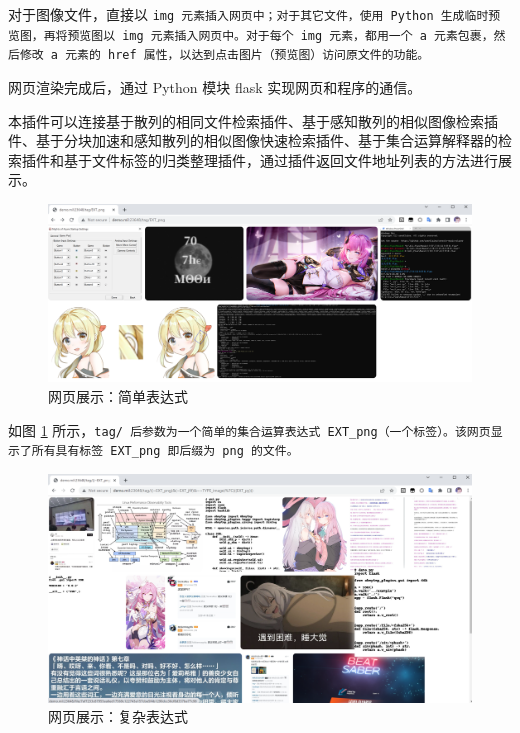 对于图像文件，直接以 \tt{img} 元素插入网页中；对于其它文件，使用 Python 生成临时预览图，再将预览图以 \tt{img} 元素插入网页中。对于每个 \tt{img} 元素，都用一个 \tt{a} 元素包裹，然后修改 \tt{a} 元素的 \tt{href} 属性，以达到点击图片（预览图）访问原文件的功能。

网页渲染完成后，通过 Python 模块 flask 实现网页和程序的通信。

本插件可以连接基于散列的相同文件检索插件、基于感知散列的相似图像检索插件、基于分块加速和感知散列的相似图像快速检索插件、基于集合运算解释器的检索插件和基于文件标签的归类整理插件，通过插件返回文件地址列表的方法进行展示。

\begin{figure}[h]
    \centering
    \includegraphics[width=\textwidth]{figures/flask1.png}
    \caption{网页展示：简单表达式}
    \label{fig:flask1}
\end{figure}

如图 \ref{fig:flask1} 所示，\tt{tag/} 后参数为一个简单的集合运算表达式 \tt{EXT\_png}（一个标签）。该网页显示了所有具有标签 \tt{EXT\_png} 即后缀为 \tt{png} 的文件。

\begin{figure}[h]
    \centering
    \includegraphics[width=\textwidth]{figures/flask2.png}
    \caption{网页展示：复杂表达式}
    \label{fig:flask2}
\end{figure}

